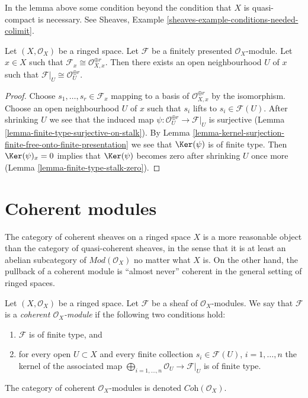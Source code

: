 \begin{remark}
\label{remark-condition-necessary}
In the lemma above some condition beyond the condition that $X$
is quasi-compact is necessary. See
Sheaves, Example \ref{sheaves-example-conditions-needed-colimit}.
\end{remark}

\begin{lemma}
\label{lemma-finite-presentation-stalk-free}
Let $(X, \mathcal{O}_X)$ be a ringed space. Let $\mathcal{F}$ be
a finitely presented $\mathcal{O}_X$-module. Let $x \in X$ such that
$\mathcal{F}_x \cong \mathcal{O}_{X, x}^{\oplus r}$. Then there exists
an open neighbourhood $U$ of $x$ such that
$\mathcal{F}|_U \cong \mathcal{O}_U^{\oplus r}$.
\end{lemma}

\begin{proof}
Choose $s_1, \ldots, s_r \in \mathcal{F}_x$ mapping to a basis of
$\mathcal{O}_{X, x}^{\oplus r}$ by the isomorphism. Choose an open
neighbourhood $U$ of $x$ such that $s_i$ lifts to $s_i \in \mathcal{F}(U)$.
After shrinking $U$ we see that the induced map
$\psi : \mathcal{O}_U^{\oplus r} \to \mathcal{F}|_U$ is surjective
(Lemma \ref{lemma-finite-type-surjective-on-stalk}).
By Lemma \ref{lemma-kernel-surjection-finite-free-onto-finite-presentation}
we see that $\Ker(\psi)$ is of finite type.
Then $\Ker(\psi)_x = 0$ implies that $\Ker(\psi)$ becomes zero
after shrinking $U$ once more (Lemma \ref{lemma-finite-type-stalk-zero}).
\end{proof}





\section{Coherent modules}
\label{section-coherent}

\noindent
The category of coherent sheaves on a ringed space $X$
is a more reasonable object
than the category of quasi-coherent sheaves, in the sense
that it is at least an abelian subcategory of $\textit{Mod}(\mathcal{O}_X)$
no matter what $X$ is. On the other hand, the pullback of a
coherent module is ``almost never'' coherent in the general setting
of ringed spaces.

\begin{definition}
\label{definition-coherent}
Let $(X, \mathcal{O}_X)$ be a ringed space.
Let $\mathcal{F}$ be a sheaf of $\mathcal{O}_X$-modules.
We say that $\mathcal{F}$ is a {\it coherent $\mathcal{O}_X$-module}
if the following two conditions hold:
\begin{enumerate}
\item $\mathcal{F}$ is of finite type, and
\item for every open $U \subset X$ and every finite
collection $s_i \in \mathcal{F}(U)$, $i = 1, \ldots, n$
the kernel of the associated map
$\bigoplus_{i = 1, \ldots, n} \mathcal{O}_U \to \mathcal{F}|_U$
is of finite type.
\end{enumerate}
The category of coherent $\mathcal{O}_X$-modules is denoted
$\textit{Coh}(\mathcal{O}_X)$.
\end{definition}

